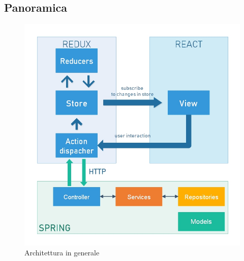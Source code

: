 \subsection{Panoramica}
\begin{figure}[H]
\centering
\includegraphics[width=17cm, keepaspectratio]{img/photo_2019-04-08_19-26-02.jpg} 
\caption{Architettura in generale}
\end{figure}


